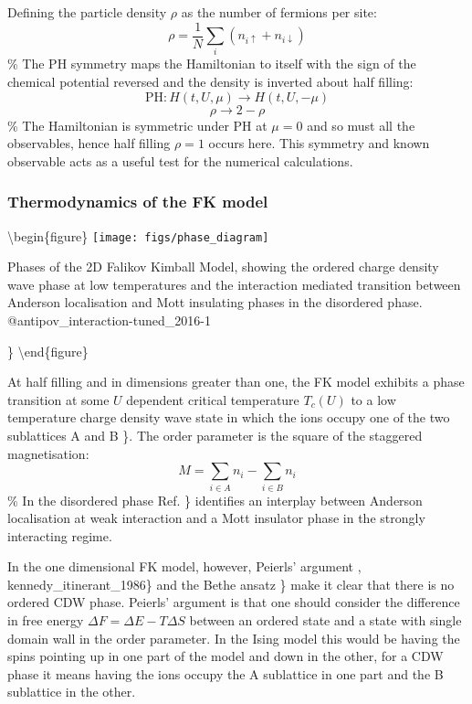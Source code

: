 Defining the particle density \(\rho\) as the number of fermions per
site: \[
    \rho = \frac{1}{N} \sum_i \left( n_{i \uparrow} + n_{i \downarrow} \right)
\] \% The PH symmetry maps the Hamiltonian to itself with the sign of
the chemical potential reversed and the density is inverted about half
filling: \[ \text{PH} : H(t, U, \mu) \rightarrow H(t, U, -\mu) \]
\[ \rho \rightarrow 2 - \rho \] \% The Hamiltonian is symmetric under PH
at \(\mu = 0\) and so must all the observables, hence half filling
\(\rho = 1\) occurs here. This symmetry and known observable acts as a
useful test for the numerical calculations.

\hypertarget{thermodynamics-of-the-fk-model}{%
\subsubsection{Thermodynamics of the FK
model}\label{thermodynamics-of-the-fk-model}}

\textbackslash begin\{figure\} \centering
\texttt{[image: figs/phase\_diagram]}

\caption{Phases of the 2D Falikov Kimball Model, showing the ordered charge density wave phase at low temperatures and the interaction mediated transition between Anderson localisation and Mott insulating phases in the disordered phase. @antipov_interaction-tuned_2016-1}

\} \label{fig:FK_phase_diagram} \textbackslash end\{figure\}

At half filling and in dimensions greater than one, the FK model
exhibits a phase transition at some \(U\) dependent critical temperature
\(T_c(U)\) to a low temperature charge density wave state in which the
ions occupy one of the two sublattices A and B
\textcite{maska_thermodynamics_2006-1}\}. The order parameter is the
square of the staggered magnetisation: \[
M = \sum_{i \in A} n_i - \sum_{i \in B} n_i
\] \% In the disordered phase Ref.
\textcite{antipov_interaction-tuned_2016-1}\} identifies an interplay
between Anderson localisation at weak interaction and a Mott insulator
phase in the strongly interacting regime.

In the one dimensional FK model, however, Peierls' argument
\textcite{peierls_isings_1936}, kennedy\_itinerant\_1986\} and the Bethe
ansatz \textcite{lieb_absence_1968}\} make it clear that there is no
ordered CDW phase. Peierls' argument is that one should consider the
difference in free energy \(\Delta F = \Delta E - T\Delta S\) between an
ordered state and a state with single domain wall in the order
parameter. In the Ising model this would be having the spins pointing up
in one part of the model and down in the other, for a CDW phase it means
having the ions occupy the A sublattice in one part and the B sublattice
in the other.

